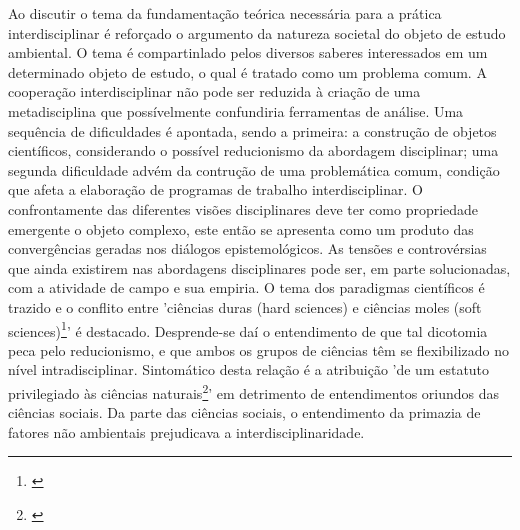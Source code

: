 \documentclass[
   article,       %
   12pt,          %
   oneside,       %
   a4paper,       %
   english,       %
   brazil,           %
   sumario=tradicional
   ]{abntex2}
\begin{document}
Ao discutir o tema da fundamentação teórica necessária para a prática interdisciplinar é reforçado o argumento da natureza societal do objeto de estudo ambiental. O tema é compartinlado pelos diversos saberes interessados em um determinado objeto de estudo, o qual é tratado como um problema comum. A cooperação interdisciplinar não pode ser reduzida à criação de uma metadisciplina que possívelmente confundiria ferramentas de análise. Uma sequência de dificuldades é apontada, sendo a primeira: a construção de objetos científicos, considerando o possível reducionismo da abordagem disciplinar; uma segunda dificuldade advém da contrução de uma problemática comum, condição que afeta a elaboração de programas de trabalho interdisciplinar. O confrontamente das diferentes visões disciplinares deve ter como propriedade emergente o objeto complexo, este então se apresenta como um produto das convergências geradas nos diálogos epistemológicos. As tensões e controvérsias que ainda existirem nas abordagens disciplinares pode ser, em parte solucionadas, com a atividade de campo e sua empiria. O tema dos paradigmas científicos é trazido e o conflito entre 'ciências duras (hard sciences) e ciências moles (soft sciences)\footnote{\cite[p.117]{Interdisciplinares_Consolidados}}' é destacado. Desprende-se daí o entendimento de que tal dicotomia peca pelo reducionismo, e que ambos os grupos de ciências têm se flexibilizado no nível intradisciplinar. Sintomático desta relação é a atribuição 'de um estatuto privilegiado às ciências naturais\footnote{\cite[p.117]{Interdisciplinares_Consolidados}}' em detrimento de entendimentos oriundos das ciências sociais. Da parte das ciências sociais, o entendimento da primazia de fatores não ambientais prejudicava a interdisciplinaridade.
\end{document}
